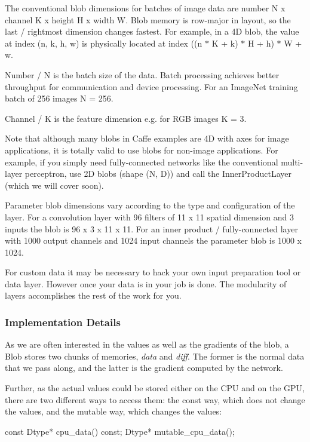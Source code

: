 The conventional blob dimensions for batches of image data are number N x channel K x height H x width W. Blob memory is row-\/major in layout, so the last / rightmost dimension changes fastest. For example, in a 4D blob, the value at index (n, k, h, w) is physically located at index ((n $\ast$ K + k) $\ast$ H + h) $\ast$ W + w.


\begin{DoxyItemize}
\item Number / N is the batch size of the data. Batch processing achieves better throughput for communication and device processing. For an Image\+Net training batch of 256 images N = 256.
\item Channel / K is the feature dimension e.\+g. for R\+GB images K = 3.
\end{DoxyItemize}

Note that although many blobs in Caffe examples are 4D with axes for image applications, it is totally valid to use blobs for non-\/image applications. For example, if you simply need fully-\/connected networks like the conventional multi-\/layer perceptron, use 2D blobs (shape (N, D)) and call the Inner\+Product\+Layer (which we will cover soon).

Parameter blob dimensions vary according to the type and configuration of the layer. For a convolution layer with 96 filters of 11 x 11 spatial dimension and 3 inputs the blob is 96 x 3 x 11 x 11. For an inner product / fully-\/connected layer with 1000 output channels and 1024 input channels the parameter blob is 1000 x 1024.

For custom data it may be necessary to hack your own input preparation tool or data layer. However once your data is in your job is done. The modularity of layers accomplishes the rest of the work for you.

\subsubsection*{Implementation Details}

As we are often interested in the values as well as the gradients of the blob, a Blob stores two chunks of memories, {\itshape data} and {\itshape diff}. The former is the normal data that we pass along, and the latter is the gradient computed by the network.

Further, as the actual values could be stored either on the C\+PU and on the G\+PU, there are two different ways to access them\+: the const way, which does not change the values, and the mutable way, which changes the values\+: \begin{DoxyVerb}const Dtype* cpu_data() const;
Dtype* mutable_cpu_data();
\end{DoxyVerb}


